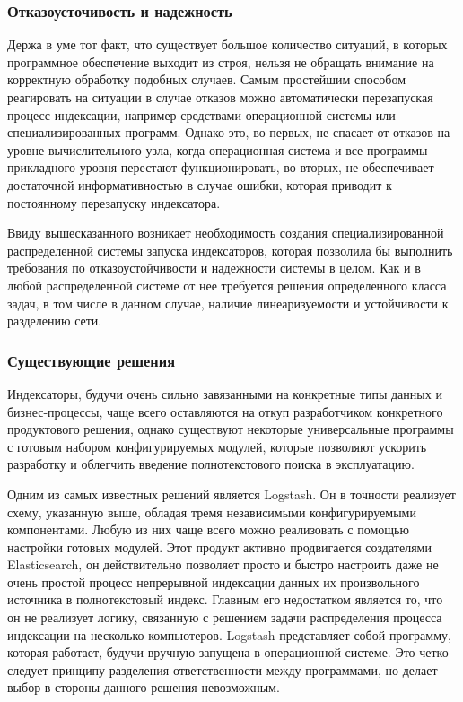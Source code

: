 \subsubsection{Отказоусточивость и надежность}

Держа в уме тот факт, что существует большое количество ситуаций, в которых программное обеспечение выходит из строя, нельзя не обращать внимание на корректную обработку подобных случаев. Самым простейшим способом реагировать на ситуации в случае отказов можно автоматически перезапуская процесс индексации, например средствами операционной системы или специализированных программ. Однако это, во-первых, не спасает от отказов на уровне вычислительного узла, когда операционная система и все программы прикладного уровня перестают функционировать, во-вторых, не обеспечивает достаточной информативностью в случае ошибки, которая приводит к постоянному перезапуску индексатора.

Ввиду вышесказанного возникает необходимость создания специализированной распределенной системы запуска индексаторов, которая позволила бы выполнить требования по отказоустойчивости и надежности системы в целом. Как и в любой распределенной системе от нее требуется решения определенного класса задач, в том числе в данном случае, наличие линеаризуемости и устойчивости к разделению сети.

\subsubsection{Существующие решения}

Индексаторы, будучи очень сильно завязанными на конкретные типы данных и бизнес-процессы, чаще всего оставляются на откуп разработчиком конкретного продуктового решения, однако существуют некоторые универсальные программы с готовым набором конфигурируемых модулей, которые позволяют ускорить разработку и облегчить введение полнотекстового поиска в эксплуатацию.

Одним из самых известных решений является Logstash. Он в точности реализует схему, указанную выше, обладая тремя независимыми конфигурируемыми компонентами. Любую из них чаще всего можно реализовать с помощью настройки готовых модулей. Этот продукт активно продвигается создателями Elasticsearch, он действительно позволяет просто и быстро настроить даже не очень простой процесс непрерывной индексации данных их произвольного источника в полнотекстовый индекс. Главным его недостатком является то, что он не реализует логику, связанную с решением задачи распределения процесса индексации на несколько компьютеров. Logstash представляет собой программу, которая работает, будучи вручную запущена в операционной системе. Это четко следует принципу разделения ответственности между программами, но делает выбор в стороны данного решения невозможным.


